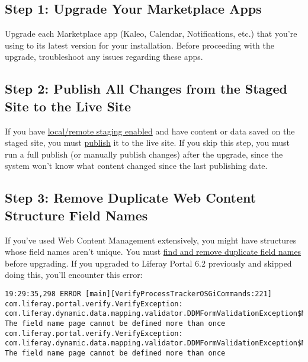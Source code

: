 \subsection{Step 1: Upgrade Your Marketplace
Apps}\label{step-1-upgrade-your-marketplace-apps}

Upgrade each Marketplace app (Kaleo, Calendar, Notifications, etc.) that
you're using to its latest version for your installation. Before
proceeding with the upgrade, troubleshoot any issues regarding these
apps.

\subsection{Step 2: Publish All Changes from the Staged Site to the
Live
Site}\label{step-2-publish-all-changes-from-the-staged-site-to-the-live-site}

If you have
\href{/docs/7-0/user/-/knowledge_base/u/enabling-staging}{local/remote
staging enabled} and have content or data saved on the staged site, you
must
\href{/docs/7-0/user/-/knowledge_base/u/publishing-staged-content-efficiently}{publish}
it to the live site. If you skip this step, you must run a full publish
(or manually publish changes) after the upgrade, since the system won't
know what content changed since the last publishing date.

\subsection{Step 3: Remove Duplicate Web Content Structure Field
Names}\label{step-3-remove-duplicate-web-content-structure-field-names}

If you've used Web Content Management extensively, you might have
structures whose field names aren't unique. You must
\href{/docs/6-2/deploy/-/knowledge_base/d/upgrading-liferay\#find-and-remove-duplicate-field-names}{find
and remove duplicate field names} before upgrading. If you upgraded to
Liferay Portal 6.2 previously and skipped doing this, you'll encounter
this error:

\begin{verbatim}
19:29:35,298 ERROR [main][VerifyProcessTrackerOSGiCommands:221] com.liferay.portal.verify.VerifyException: com.liferay.dynamic.data.mapping.validator.DDMFormValidationException$MustNotDuplicateFieldName: The field name page cannot be defined more than once
com.liferay.portal.verify.VerifyException: com.liferay.dynamic.data.mapping.validator.DDMFormValidationException$MustNotDuplicateFieldName: The field name page cannot be defined more than once
\end{verbatim}

